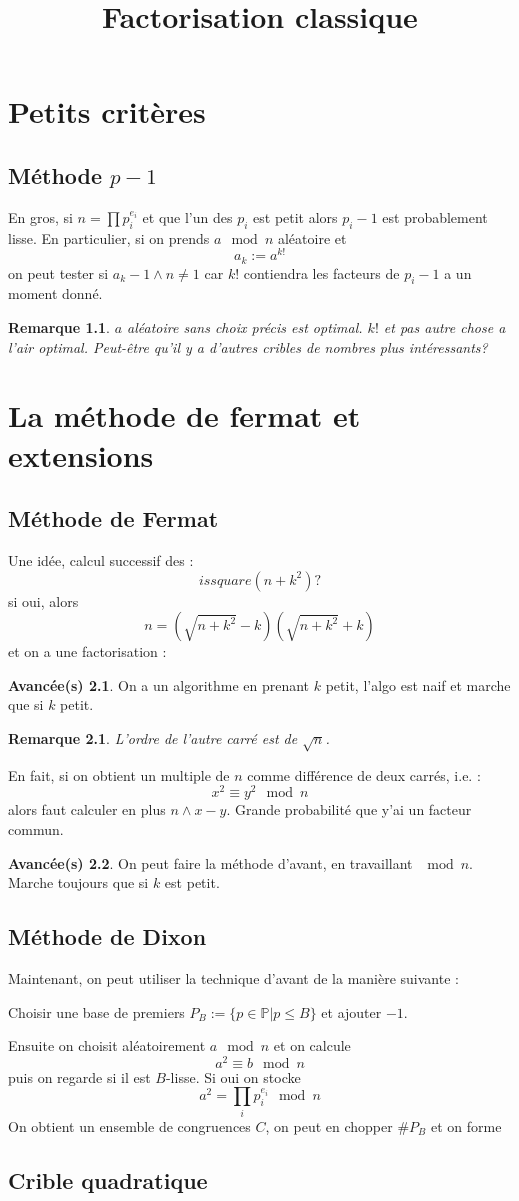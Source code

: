 \documentclass[a4paper,12pt]{book}
\title{Factorisation classique}
\date{}
\theoremstyle{plain}
\newtheorem{rem}{Remarque}
\theoremstyle{definition}
\newtheorem{avanc}{Avancée(s)}
\theoremstyle{remark}
\begin{document}
\maketitle
\tableofcontents
\chapter{Petits critères}
\section{Méthode $p-1$}
En gros, si $n=\prod p_i^{e_i}$ et que l'un des $p_i$
est petit alors $p_i-1$ est probablement lisse. En 
particulier, si on prends $a\mod n$ aléatoire et
\[a_k:=a^{k!}\]
on peut tester si $a_k-1\wedge n\ne 1$ car $k!$
contiendra les facteurs de $p_i-1$ a un moment donné.

\begin{rem}
    $a$ aléatoire sans choix précis est optimal. 
    $k!$ et pas autre chose a l'air optimal. Peut-être
    qu'il y a d'autres cribles de nombres plus 
    intéressants?
\end{rem}


\chapter{La méthode de fermat et extensions}
\section{Méthode de Fermat}
Une idée, calcul successif des : 
\[issquare(n+k^2)?\]
si oui, alors \[n=(\sqrt{n+k^2}-k)(\sqrt{n+k^2}+k)\]
et on a une factorisation :
\begin{avanc}
    On a un algorithme en prenant $k$ petit, l'algo est
    naif et marche que si $k$ petit.
\end{avanc}
\begin{rem}
    L'ordre de l'autre carré est de $\sqrt n$.
\end{rem}

En fait, si on obtient un multiple de $n$ comme différence de 
deux carrés, i.e. :
\[x^2\equiv y^2\mod n\]
alors faut calculer en plus $n\wedge x-y$. Grande probabilité
que y'ai un facteur commun.
\begin{avanc}
    On peut faire la méthode d'avant, en travaillant $\mod n$.
    Marche toujours que si $k$ est petit.
\end{avanc}

\section{Méthode de Dixon}
Maintenant, on peut utiliser la technique d'avant de la manière
suivante :
\begin{center}
    Choisir une base de premiers $P_B:=\{p\in\mathbb P|p\leq B\}$
    et ajouter $-1$.
\end{center}
Ensuite on choisit aléatoirement $a\mod n$ et on calcule
\[a^2\equiv b\mod n\]
puis on regarde si il est $B$-lisse. Si oui on stocke 
\[a^2=\prod_i p_i^{e_i}\mod n\]
On obtient un ensemble de congruences $C$, on peut en chopper
$\# P_B$ et on forme 

\section{Crible quadratique}







\printbibliography
\end{document}
